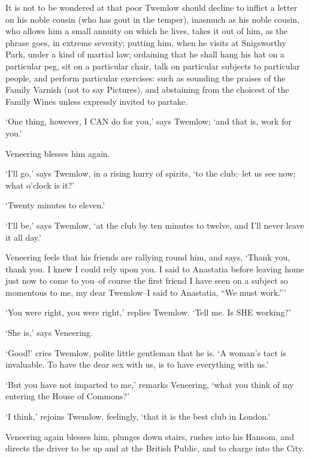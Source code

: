 It is not to be wondered at that poor Twemlow should decline to inflict
a letter on his noble cousin (who has gout in the temper), inasmuch
as his noble cousin, who allows him a small annuity on which he lives,
takes it out of him, as the phrase goes, in extreme severity; putting
him, when he visits at Snigsworthy Park, under a kind of martial law;
ordaining that he shall hang his hat on a particular peg, sit on a
particular chair, talk on particular subjects to particular people, and
perform particular exercises: such as sounding the praises of the Family
Varnish (not to say Pictures), and abstaining from the choicest of the
Family Wines unless expressly invited to partake.

‘One thing, however, I CAN do for you,’ says Twemlow; ‘and that is, work
for you.’

Veneering blesses him again.

‘I’ll go,’ says Twemlow, in a rising hurry of spirits, ‘to the
club;--let us see now; what o’clock is it?’

‘Twenty minutes to eleven.’

‘I’ll be,’ says Twemlow, ‘at the club by ten minutes to twelve, and I’ll
never leave it all day.’

Veneering feels that his friends are rallying round him, and says,
‘Thank you, thank you. I knew I could rely upon you. I said to Anastatia
before leaving home just now to come to you--of course the first friend
I have seen on a subject so momentous to me, my dear Twemlow--I said to
Anastatia, “We must work.”’

‘You were right, you were right,’ replies Twemlow. ‘Tell me. Is SHE
working?’

‘She is,’ says Veneering.

‘Good!’ cries Twemlow, polite little gentleman that he is. ‘A woman’s
tact is invaluable. To have the dear sex with us, is to have everything
with us.’

‘But you have not imparted to me,’ remarks Veneering, ‘what you think of
my entering the House of Commons?’

‘I think,’ rejoins Twemlow, feelingly, ‘that it is the best club in
London.’

Veneering again blesses him, plunges down stairs, rushes into his
Hansom, and directs the driver to be up and at the British Public, and
to charge into the City.

